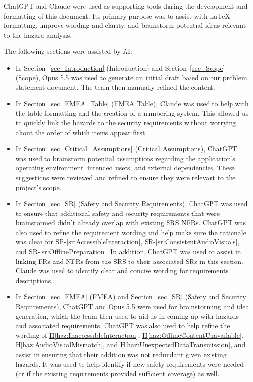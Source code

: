 \documentclass{article}
\newcounter{hazard}
\newcommand{\hazref}[1]{\hyperref[haz:#1]{H\ref*{haz:#1}}}
\newcounter{sr}
\newcommand{\srref}[1]{\hyperref[sr:#1]{SR-\ref*{sr:#1}}}
\begin{document}
ChatGPT and Claude were used as supporting tools during the development and formatting
of this document. Its primary purpose was to assist with \LaTeX{} formatting,
improve wording and clarity, and brainstorm potential ideas relevant to the
hazard analysis.

The following sections were assisted by AI:

\begin{itemize}
  \item In Section~\ref{sec_Introduction} (Introduction) and Section~\ref{sec_Scope} (Scope),
  Opus 5.5 was used to generate an initial draft based on our problem statement document.
  The team then manually refined the content.

  \item In Section~\ref{sec_FMEA_Table} (FMEA Table), Claude was used to help with the table formatting
  and the creation of a numbering system. This allowed us to quickly link the
  hazards to the security requirements without worrying about the order of
  which items appear first.
  
  \item In Section~\ref{sec_Critical_Assumptions} (Critical Assumptions),
  ChatGPT was used to brainstorm potential assumptions regarding
  the application's operating environment, intended users, and
  external dependencies. These suggestions were reviewed and
  refined to ensure they were relevant to the project's scope.

  \item In Section~\ref{sec_SR} (Safety and Security Requirements),
  ChatGPT was used to ensure that additional safety and security
  requirements that were brainstormed didn't already overlap with existing SRS 
  NFRs. ChatGPT was also used to refine the requirement wording and help make sure the rationale was clear for 
  \srref{AccessibleInteraction}, \srref{ConsistentAudioVisuals}, and \srref{OfflinePreparation}. In addition, ChatGPT 
  was used to assist in linking FRs and NFRs from the SRS to their associated SRs in this section. Claude was used to
  identify clear and concise wording for requirements descriptions.

  \item In Section~\ref{sec_FMEA} (FMEA) and Section~\ref{sec_SR} (Safety and Security Requirements),
  ChatGPT and Opus 5.5 were used for brainstorming and idea generation, which the team
  then used to aid us in coming up with hazards and associated requirements. ChatGPT was also used to help refine the wording of \hazref{InaccessibleInteraction}, \hazref{OfflineContentUnavailable},
  \hazref{AudioVisualMismatch}, and \hazref{UnexpectedDataTransmission}, and assist in ensuring that their addition was not redundant given existing hazards. It was used 
  to help identify if new safety requirements were needed (or if the existing requirements provided sufficient coverage) as well.


\end{itemize}
\end{document}
